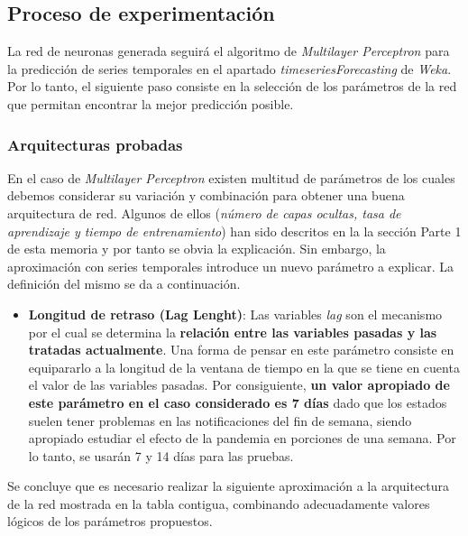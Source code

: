 \documentclass[12pt,a4paper, xcolor=table]{article}
\begin{document}
    \subsection{Proceso de experimentación}
    La red de neuronas generada seguirá el algoritmo de \textit{Multilayer Perceptron }para la predicción de series temporales en el apartado \textit{timeseriesForecasting} de \textit{Weka}. Por lo tanto, el siguiente paso consiste en la selección de los parámetros de la red que permitan encontrar la mejor predicción posible.

        \subsubsection{Arquitecturas probadas}

        En el caso de \textit{Multilayer Perceptron } existen multitud de parámetros de los cuales debemos considerar su variación y combinación para obtener una buena arquitectura de red. Algunos de ellos (\textit{número de capas ocultas, tasa de aprendizaje y tiempo de entrenamiento}) han sido descritos en la la sección Parte 1 de esta memoria y por tanto se obvia la explicación. Sin embargo, la aproximación con series temporales introduce un nuevo parámetro a explicar. La definición del mismo se da a continuación.

        \begin{itemize}
        \item \textbf{Longitud de retraso (Lag Lenght)}: Las variables \textit{lag} son el mecanismo por el cual se determina la \textbf{relación entre las variables pasadas y las tratadas actualmente}. Una forma de pensar en este parámetro consiste en equipararlo a la longitud de la ventana de tiempo en la que se tiene en cuenta el valor de las variables pasadas. Por consiguiente, \textbf{un valor apropiado de este parámetro en el caso considerado es 7 días} dado que los estados suelen tener problemas en las notificaciones del fin de semana, siendo apropiado estudiar el efecto de la pandemia en porciones de una semana. Por lo tanto, se usarán 7 y 14 días para las pruebas.
        \end{itemize}

        Se concluye que es necesario realizar la siguiente aproximación a la arquitectura de la red mostrada en la tabla contigua, combinando adecuadamente valores lógicos de los parámetros propuestos.
\end{document}
